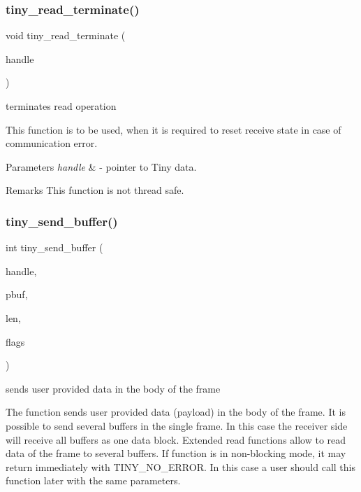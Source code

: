 \subsubsection{\texorpdfstring{tiny\+\_\+read\+\_\+terminate()}{tiny\_read\_terminate()}}
{\footnotesize\ttfamily void tiny\+\_\+read\+\_\+terminate (\begin{DoxyParamCaption}\item[{\hyperlink{structSTinyData}{S\+Tiny\+Data} $\ast$}]{handle }\end{DoxyParamCaption})}



terminates read operation 

This function is to be used, when it is required to reset receive state in case of communication error.


\begin{DoxyParams}{Parameters}
{\em handle} & -\/ pointer to Tiny data. \\
\hline
\end{DoxyParams}
\begin{DoxyRemark}{Remarks}
This function is not thread safe. 
\end{DoxyRemark}
\mbox{\label{group__ADVANCED__API_gabe04a4e76adc5421deac4e3699a15646}} 
\subsubsection{\texorpdfstring{tiny\+\_\+send\+\_\+buffer()}{tiny\_send\_buffer()}}
{\footnotesize\ttfamily int tiny\+\_\+send\+\_\+buffer (\begin{DoxyParamCaption}\item[{\hyperlink{structSTinyData}{S\+Tiny\+Data} $\ast$}]{handle,  }\item[{uint8\+\_\+t $\ast$}]{pbuf,  }\item[{int}]{len,  }\item[{uint8\+\_\+t}]{flags }\end{DoxyParamCaption})}



sends user provided data in the body of the frame 

The function sends user provided data (payload) in the body of the frame. It is possible to send several buffers in the single frame. In this case the receiver side will receive all buffers as one data block. Extended read functions allow to read data of the frame to several buffers. If function is in non-\/blocking mode, it may return immediately with T\+I\+N\+Y\+\_\+\+N\+O\+\_\+\+E\+R\+R\+OR. In this case a user should call this function later with the same parameters.

